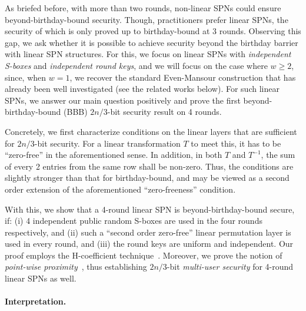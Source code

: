 As briefed before, with more than two rounds, non-linear SPNs could ensure beyond-birthday-bound security. Though, practitioners prefer linear SPNs, the security of which is only proved up to birthday-bound at 3 rounds.
%
%
%
Observing this gap, we ask whether it is possible to achieve security beyond the birthday barrier with linear SPN structures. For this, we focus on linear SPNs with {\it independent S-boxes} and {\it independent round keys}, and we will focus on the case where $w\geq2$, since, when $w = 1$, we recover the standard Even-Mansour construction that has already been well investigated (see the related works below). For such linear SPNs, we answer our main question positively and prove the first beyond-birthday-bound (BBB) $2n/3$-bit security result on 4 rounds.


Concretely, we first characterize conditions on the linear layers that are sufficient for $2n/3$-bit security. For a linear transformation $T$ to meet this, it has to be ``zero-free'' in the aforementioned sense. In addition, in both $T$ and $T^{-1}$, the sum of every 2 entries from the same row shall be non-zero. Thus, the conditions are slightly stronger than that for birthday-bound, and may be viewed as a second order extension of the aforementioned ``zero-freeness'' condition.
%
%

With this, we show that a 4-round linear SPN is beyond-birthday-bound secure, if: (i) 4 independent public random S-boxes are used in the four rounds respectively, and (ii) such a ``second order zero-free'' linear permutation layer is used in every round, and (iii) the round keys are uniform and independent. Our proof employs the H-coefficient technique~\cite{SAC:Patarin08}. Moreover, we prove the notion of {\it point-wise proximity}~\cite{C:HoaTes16}, thus establishing $2n/3$-bit {\it multi-user security} for 4-round linear SPNs as well.





\paragraph{Interpretation.}

